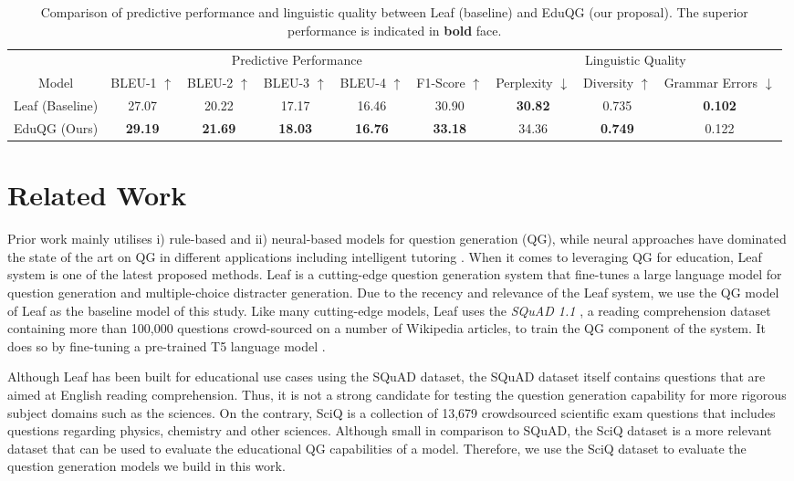 \documentclass[letterpaper]{article} %
\begin{document}
\begin{table}[t!] \centering \small
\begin{tabular}{c|ccccc|ccc}
\hline
& \multicolumn{5}{c}{Predictive Performance}                          & \multicolumn{3}{c}{Linguistic Quality}       \\
Model           & BLEU-1 $\uparrow$     & BLEU-2 $\uparrow$     & BLEU-3 $\uparrow$     & BLEU-4   $\uparrow$   & F1-Score  $\uparrow$        & Perplexity $\downarrow$       & Diversity $\uparrow$         & Grammar Errors $\downarrow$        \\

\hline
Leaf (Baseline) & 27.07          & 20.22          & 17.17          & {16.46} & 30.90          & \textbf{30.82} & 0.735          & \textbf{0.102} \\
EduQG (Ours)        & \textbf{29.19} & \textbf{21.69} & \textbf{18.03} & \textbf{16.76} & \textbf{33.18} & 34.36          & \textbf{0.749} & 0.122  \\
\hline
\end{tabular}
\caption{Comparison of predictive performance and linguistic quality between Leaf (baseline) and EduQG (our proposal). The superior performance is indicated in \textbf{bold} face.}
\label{results}
\end{table}
\section{Related Work}

Prior work mainly utilises i) rule-based and ii) neural-based models for question generation (QG), while neural approaches have dominated the state of the art on QG in different applications including intelligent tutoring \cite{zhang2021review}.
When it comes to leveraging QG for education, Leaf system \cite{vachev2022leaf} is one of the latest proposed methods.
Leaf is a cutting-edge question generation system that fine-tunes a large language model for question generation and multiple-choice distracter generation. Due to the recency and relevance of the Leaf system, we use the QG model of Leaf as the baseline model of this study.
Like many cutting-edge models, Leaf uses the \emph{SQuAD 1.1} \cite{DBLP:rajpurkar2016squad}, a reading comprehension dataset containing more than 100,000 questions crowd-sourced on a number of Wikipedia articles, to train the QG component of the system. It does so by fine-tuning a pre-trained T5 language model \cite{raffel2020exploring}.

Although Leaf has been built for educational use cases using the SQuAD dataset, the SQuAD dataset itself contains questions that are aimed at English reading comprehension. Thus, it is not a strong candidate for testing the question generation capability for more rigorous subject domains such as the sciences.
On the contrary, SciQ \cite{welbl-etal-2017-crowdsourcing} is a collection of 13,679 crowdsourced scientific exam questions that includes questions regarding physics, chemistry and other sciences. Although small in comparison to SQuAD, the SciQ dataset is a more relevant dataset that can be used to evaluate the educational QG capabilities of a model. Therefore, we use the SciQ dataset to evaluate the question generation models we build in this work.
\end{document}

